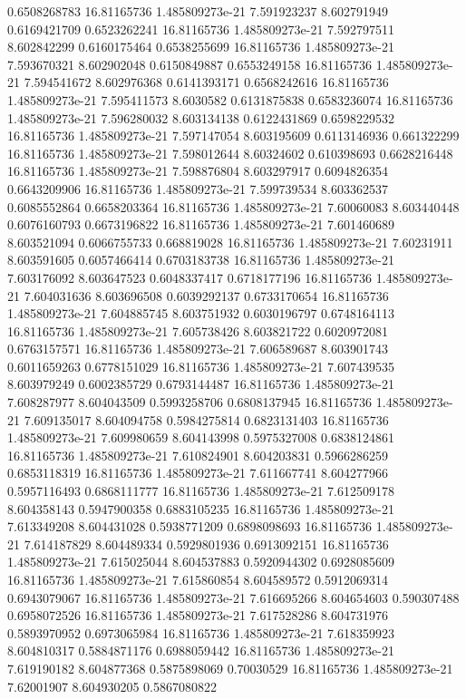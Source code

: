 {0.6508268783 16.81165736 1.485809273e-21 7.591923237 8.602791949 0.6169421709
0.6523262241 16.81165736 1.485809273e-21 7.592797511 8.602842299 0.6160175464
0.6538255699 16.81165736 1.485809273e-21 7.593670321 8.602902048 0.6150849887
0.6553249158 16.81165736 1.485809273e-21 7.594541672 8.602976368 0.6141393171
0.6568242616 16.81165736 1.485809273e-21 7.595411573 8.6030582 0.6131875838
0.6583236074 16.81165736 1.485809273e-21 7.596280032 8.603134138 0.6122431869
0.6598229532 16.81165736 1.485809273e-21 7.597147054 8.603195609 0.6113146936
0.661322299 16.81165736 1.485809273e-21 7.598012644 8.60324602 0.610398693
0.6628216448 16.81165736 1.485809273e-21 7.598876804 8.603297917 0.6094826354
0.6643209906 16.81165736 1.485809273e-21 7.599739534 8.603362537 0.6085552864
0.6658203364 16.81165736 1.485809273e-21 7.60060083 8.603440448 0.6076160793
0.6673196822 16.81165736 1.485809273e-21 7.601460689 8.603521094 0.6066755733
0.668819028 16.81165736 1.485809273e-21 7.60231911 8.603591605 0.6057466414
0.6703183738 16.81165736 1.485809273e-21 7.603176092 8.603647523 0.6048337417
0.6718177196 16.81165736 1.485809273e-21 7.604031636 8.603696508 0.6039292137
0.6733170654 16.81165736 1.485809273e-21 7.604885745 8.603751932 0.6030196797
0.6748164113 16.81165736 1.485809273e-21 7.605738426 8.603821722 0.6020972081
0.6763157571 16.81165736 1.485809273e-21 7.606589687 8.603901743 0.6011659263
0.6778151029 16.81165736 1.485809273e-21 7.607439535 8.603979249 0.6002385729
0.6793144487 16.81165736 1.485809273e-21 7.608287977 8.604043509 0.5993258706
0.6808137945 16.81165736 1.485809273e-21 7.609135017 8.604094758 0.5984275814
0.6823131403 16.81165736 1.485809273e-21 7.609980659 8.604143998 0.5975327008
0.6838124861 16.81165736 1.485809273e-21 7.610824901 8.604203831 0.5966286259
0.6853118319 16.81165736 1.485809273e-21 7.611667741 8.604277966 0.5957116493
0.6868111777 16.81165736 1.485809273e-21 7.612509178 8.604358143 0.5947900358
0.6883105235 16.81165736 1.485809273e-21 7.613349208 8.604431028 0.5938771209
0.6898098693 16.81165736 1.485809273e-21 7.614187829 8.604489334 0.5929801936
0.6913092151 16.81165736 1.485809273e-21 7.615025044 8.604537883 0.5920944302
0.6928085609 16.81165736 1.485809273e-21 7.615860854 8.604589572 0.5912069314
0.6943079067 16.81165736 1.485809273e-21 7.616695266 8.604654603 0.590307488
0.6958072526 16.81165736 1.485809273e-21 7.617528286 8.604731976 0.5893970952
0.6973065984 16.81165736 1.485809273e-21 7.618359923 8.604810317 0.5884871176
0.6988059442 16.81165736 1.485809273e-21 7.619190182 8.604877368 0.5875898069
0.70030529 16.81165736 1.485809273e-21 7.62001907 8.604930205 0.5867080822
}
